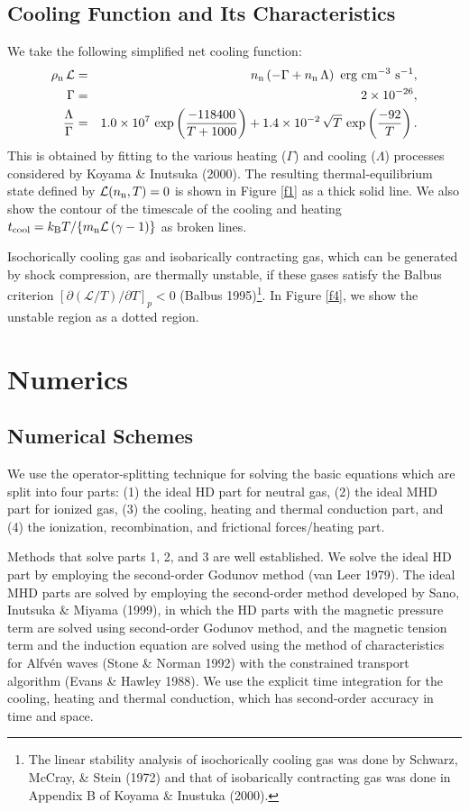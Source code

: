 \documentclass[12pt,preprint]{aastex}
\begin{document}
\subsection{Cooling Function and Its Characteristics}
We take the following simplified net cooling function:
\begin{eqnarray}
\rho_{\rm n}\,\mathcal{L} &=& n_{\rm n}\,(-\Gamma +n_{\rm n}\,\Lambda)\,\mbox{ erg cm}^{-3}\mbox{ s}^{-1}, \label{CF}\\
\Gamma &=& 2\times 10^{-26},\\
\frac{\Lambda}{\Gamma} &=& 1.0\times 10^{7}\,\exp\left( \frac{-118400}{T+1000} \right) + 1.4\times 10^{-2}\,\sqrt{T}\,\exp\left( \frac{-92}{T} \right).
\end{eqnarray}
This is obtained by fitting to the various heating ($\Gamma$) and cooling ($\Lambda$) processes considered by Koyama \& Inutsuka (2000).
The resulting thermal-equilibrium state defined by $\mathcal{L}(n_{\rm n},T)=0$ is shown in Figure \ref{f1} as a thick solid line.
We also show the contour of the timescale of the cooling and heating $t_{\rm cool}=k_{\rm B}T/\{ m_{\rm n}\mathcal{L}\,(\gamma-1)\}$ as broken lines.

Isochorically cooling gas and isobarically contracting gas, which can be generated by shock compression, are thermally unstable, if these gases satisfy the Balbus criterion $[\partial (\mathcal{L}/T)/\partial T]_{p}<0$ (Balbus 1995)\footnote{The linear stability analysis of isochorically cooling gas was done by Schwarz, McCray, \& Stein (1972) and that of isobarically contracting gas was done in Appendix B of Koyama \& Inustuka (2000).}.
In Figure \ref{f4}, we show the unstable region as a dotted region.


\section{Numerics}
\subsection{Numerical Schemes}
We use the operator-splitting technique for solving the basic equations which are split into four parts: (1) the ideal HD part for neutral gas, (2) the ideal MHD part for ionized gas, (3) the cooling, heating and thermal conduction part, and (4) the ionization, recombination, and frictional forces/heating part. 

Methods that solve parts 1, 2, and 3 are well established.
We solve the ideal HD part by employing the second-order Godunov method (van Leer 1979).
The ideal MHD parts are solved by employing the second-order method developed by Sano, Inutsuka \& Miyama (1999), in which the HD parts with the magnetic pressure term are solved using second-order Godunov method, and the magnetic tension term and the induction equation are solved using the method of characteristics for Alfv\'en waves (Stone \& Norman 1992) with the constrained transport algorithm (Evans \& Hawley 1988).
We use the explicit time integration for the cooling, heating and thermal conduction, which has second-order accuracy in time and space.
\end{document}
